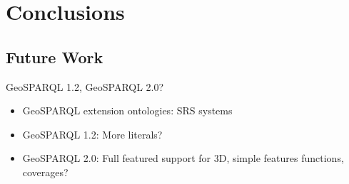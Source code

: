 \documentclass[runningheads]{llncs}
\begin{document}
\section{Conclusions}\label{sec:conclusions}

\subsection{Future Work}\label{sec:futurework}
GeoSPARQL 1.2, GeoSPARQL 2.0?
\begin{itemize}
    \item GeoSPARQL extension ontologies: SRS systems
    \item GeoSPARQL 1.2: More literals?
    \item GeoSPARQL 2.0: Full featured support for 3D, simple features functions, coverages?
\end{itemize}


%
%
%


%




\end{document}
